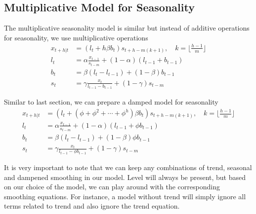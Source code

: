 \documentclass[../../time_series_notes.tex]{subfiles}
\begin{document}
\subsection{Multiplicative Model for Seasonality}
The multiplicative seasonality model is similar but instead of additive operations for seasonality, we use multiplicative operations
\begin{align*}
    x_{t+h|t} &= (l_{t} + h\beta b_{t}) s_{t+h - m(k+1)}, \quad k = \lfloor \frac{h-1}{m} \rfloor\\
    l_{t} &= \alpha\frac{x_{t-1}}{s_{t-m}} + (1-\alpha)(l_{t-1} + b_{t-1})\\
    b_{t} &= \beta (l_{t} - l_{t-1}) + (1-\beta)b_{t-1}\\
    s_{t} &= \gamma\frac{x_{t}}{l_{t-1}-b_{t-1}} + (1-\gamma)s_{t-m}
\end{align*}

Similar to last section, we can prepare a damped model for seasonality
\begin{align*}
    x_{t+h|t} &= (l_{t} + (\phi + \phi^{2} + \cdots + \phi^{h})\beta b_{t}) s_{t+h - m(k+1)}, \quad k = \lfloor \frac{h-1}{m} \rfloor\\
    l_{t} &= \alpha\frac{x_{t-1}}{s_{t-m}} + (1-\alpha)(l_{t-1} + \phi b_{t-1})\\
    b_{t} &= \beta (l_{t} - l_{t-1}) + (1-\beta)\phi b_{t-1}\\
    s_{t} &= \gamma\frac{x_{t}}{l_{t-1}-\phi b_{t-1}} + (1-\gamma)s_{t-m}
\end{align*}

It is very important to note that we can keep any combinations of trend, seasonal and dampened smoothing in our model. Level will always be present, but based on our choice of the model, we can play around with the corresponding smoothing equations. For instance, a model without trend will simply ignore all terms related to trend and also ignore the trend equation.
\end{document}
